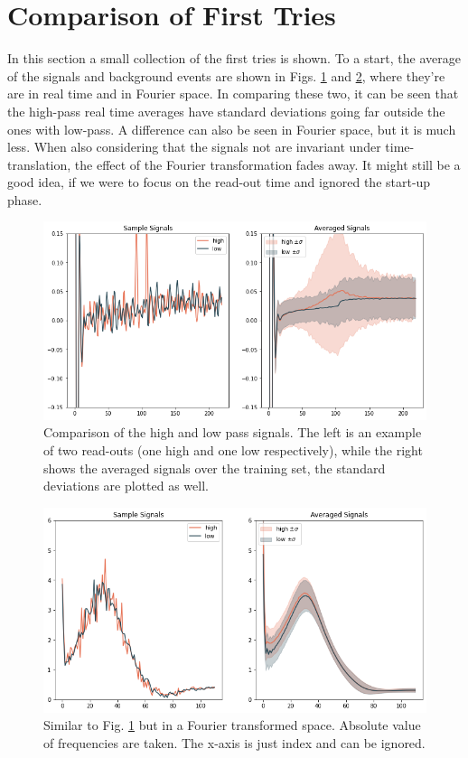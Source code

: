 \newpage
\section*{Comparison of First Tries}
In this section a small collection of the first tries is shown. To a start, the average of the signals and background events are shown in Figs. \ref{fig:samples} and \ref{fig:samples_fft}, where they're are in real time and in Fourier space. In comparing these two, it can be seen that the high-pass real time averages have standard deviations going far outside the ones with low-pass. A difference can also be seen in Fourier space, but it is much less. When also considering that the signals not are invariant under time-translation, the effect of the Fourier transformation fades away. It might still be a good idea, if we were to focus on the read-out time and ignored the start-up phase.

\begin{figure}[H]
    \centering
    \includegraphics[width = \textwidth]{Figures/johann_first/sample.png}
    \caption{Comparison of the high and low pass signals. The left is an example of two read-outs (one high and one low respectively), while the right shows the averaged signals over the training set, the standard deviations are plotted as well.}
    \label{fig:samples}
\end{figure}



\begin{figure}[H]
    \centering
    \includegraphics[width = 0.6 \textwidth]{Figures/johann_first/FFT_sample.png}
    \caption{Similar to Fig. \ref{fig:samples} but in a Fourier transformed space. Absolute value of frequencies are taken. The x-axis is just index and can be ignored. }
    \label{fig:samples_fft}
\end{figure}

